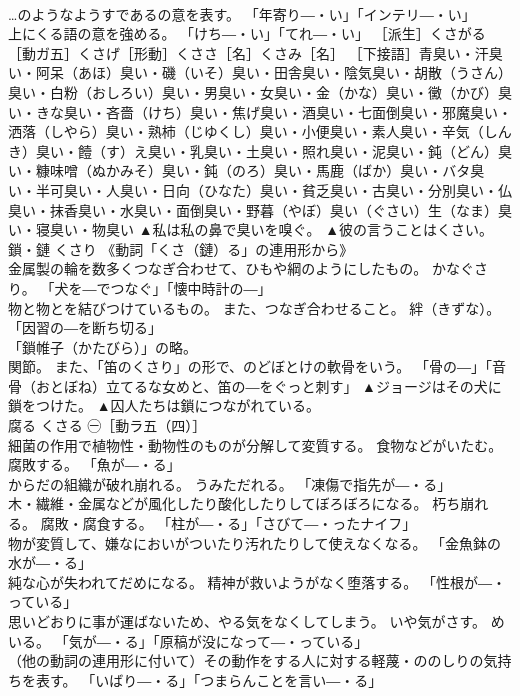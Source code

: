 \documentclass[8pt]{extreport}
\begin{document}
\begin{CJK}{UTF8}{min}
\\	…のようなようすであるの意を表す。 「年寄り―・い」「インテリ―・い」 
\\	上にくる語の意を強める。 「けち―・い」「てれ―・い」 ［派生］くさがる［動ガ五］くさげ［形動］くささ［名］くさみ［名］ ［下接語］青臭い・汗臭い・阿呆（あほ）臭い・磯（いそ）臭い・田舎臭い・陰気臭い・胡散（うさん）臭い・白粉（おしろい）臭い・男臭い・女臭い・金（かな）臭い・黴（かび）臭い・きな臭い・吝嗇（けち）臭い・焦げ臭い・酒臭い・七面倒臭い・邪魔臭い・洒落（しやら）臭い・熟柿（じゆくし）臭い・小便臭い・素人臭い・辛気（しんき）臭い・饐（す）え臭い・乳臭い・土臭い・照れ臭い・泥臭い・鈍（どん）臭い・糠味噌（ぬかみそ）臭い・鈍（のろ）臭い・馬鹿（ばか）臭い・バタ臭い・半可臭い・人臭い・日向（ひなた）臭い・貧乏臭い・古臭い・分別臭い・仏臭い・抹香臭い・水臭い・面倒臭い・野暮（やぼ）臭い（ぐさい）生（なま）臭い・寝臭い・物臭い	▲私は私の鼻で臭いを嗅ぐ。 ▲彼の言うことはくさい。
\\	鎖・鏈	くさり	《動詞「くさ（鏈）る」の連用形から》 
\\	金属製の輪を数多くつなぎ合わせて、ひもや綱のようにしたもの。 かなぐさり。 「犬を―でつなぐ」「懐中時計の―」 
\\	物と物とを結びつけているもの。 また、つなぎ合わせること。 絆（きずな）。 「因習の―を断ち切る」 
\\	「鎖帷子（かたびら）」の略。 
\\	関節。 また、「笛のくさり」の形で、のどぼとけの軟骨をいう。 「骨の―」「音骨（おとぼね）立てるな女めと、笛の―をぐっと刺す」	▲ジョージはその犬に鎖をつけた。 ▲囚人たちは鎖につながれている。
\\	腐る	くさる	㊀［動ラ五（四）］ 
\\	細菌の作用で植物性・動物性のものが分解して変質する。 食物などがいたむ。 腐敗する。 「魚が―・る」 
\\	からだの組織が破れ崩れる。 うみただれる。 「凍傷で指先が―・る」 
\\	木・繊維・金属などが風化したり酸化したりしてぼろぼろになる。 朽ち崩れる。 腐敗・腐食する。 「柱が―・る」「さびて―・ったナイフ」 
\\	物が変質して、嫌なにおいがついたり汚れたりして使えなくなる。 「金魚鉢の水が―・る」 
\\	純な心が失われてだめになる。 精神が救いようがなく堕落する。 「性根が―・っている」 
\\	思いどおりに事が運ばないため、やる気をなくしてしまう。 いや気がさす。 めいる。 「気が―・る」「原稿が没になって―・っている」 
\\	（他の動詞の連用形に付いて）その動作をする人に対する軽蔑・ののしりの気持ちを表す。 「いばり―・る」「つまらんことを言い―・る」 

\end{CJK}
\end{document}
